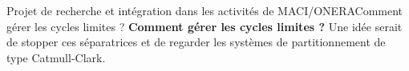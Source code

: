 \documentclass[compress,10pt,aspectratio=169]{beamer}
\begin{document}
\begin{frame}{\large Projet de recherche et intégration dans les activités de MACI/ONERA}{Comment gérer les cycles limites ?}
\textbf{Comment gérer les cycles limites ?} Une idée serait de stopper ces séparatrices et de regarder les systèmes de partitionnement de type Catmull-Clark.
\end{frame}
\end{document}
